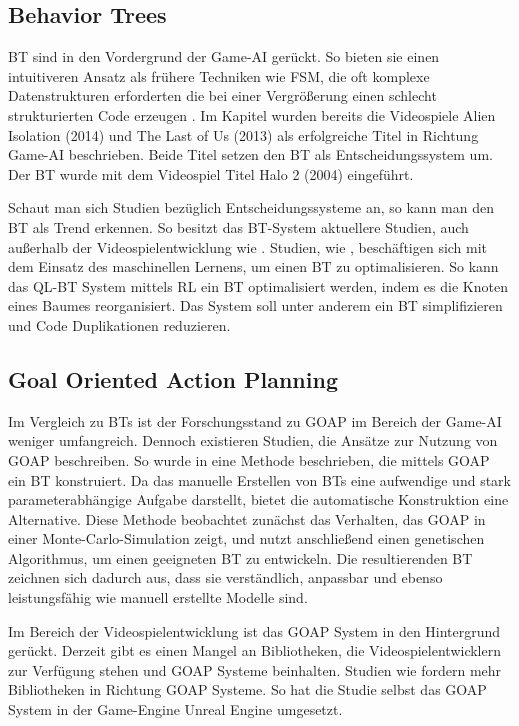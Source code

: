 \subsection{Behavior Trees}
\label{chap:bt sota}

BT sind in den Vordergrund der Game-AI ger\"{u}ckt. So bieten sie einen intuitiveren Ansatz als fr\"{u}here Techniken wie FSM, die oft komplexe Datenstrukturen erforderten die bei einer Vergr\"{o}\ss{}erung einen schlecht strukturierten Code erzeugen \autocite{qlbt}. Im Kapitel wurden bereits die Videospiele Alien Isolation (2014) und The Last of Us (2013) als erfolgreiche Titel in Richtung Game-AI beschrieben. Beide Titel setzen den BT als Entscheidungssystem um. Der BT wurde mit dem Videospiel Titel Halo 2 (2004) eingef\"{u}hrt.

Schaut man sich Studien bez\"{u}glich Entscheidungssysteme an, so kann man den BT als Trend erkennen. So besitzt das BT-System aktuellere Studien, auch au\ss{}erhalb der Videospielentwicklung wie \autocite{btuav, 8963263}. Studien, wie \autocite{rbt, qlbt}, besch\"{a}ftigen sich mit dem Einsatz des maschinellen Lernens, um einen BT zu optimalisieren. So kann das QL-BT System \autocite{qlbt} mittels RL ein BT optimalisiert werden, indem es die Knoten eines Baumes reorganisiert. Das System soll unter anderem ein BT simplifizieren und Code Duplikationen reduzieren.


\subsection{Goal Oriented Action Planning}
\label{chap:goap sota}

Im Vergleich zu BTs ist der Forschungsstand zu GOAP im Bereich der Game-AI weniger umfangreich. Dennoch existieren Studien, die Ans\"{a}tze zur Nutzung von GOAP beschreiben. So wurde in \autocite{Schwab2021} eine Methode beschrieben, die mittels GOAP ein BT konstruiert. Da das manuelle Erstellen von BTs eine aufwendige und stark parameterabh\"{a}ngige Aufgabe darstellt, bietet die automatische Konstruktion eine Alternative. Diese Methode beobachtet zun\"{a}chst das Verhalten, das GOAP in einer Monte-Carlo-Simulation zeigt, und nutzt anschlie\ss{}end einen genetischen Algorithmus, um einen geeigneten BT zu entwickeln. Die resultierenden BT zeichnen sich dadurch aus, dass sie verst\"{a}ndlich, anpassbar und ebenso leistungsf\"{a}hig wie manuell erstellte Modelle sind. \autocite{Schwab2021}

Im Bereich der Videospielentwicklung ist das GOAP System in den Hintergrund ger\"{u}ckt. Derzeit gibt es einen Mangel an Bibliotheken, die Videospielentwicklern zur Verf\"{u}gung stehen und GOAP Systeme beinhalten. Studien wie \autocite{Romero2020DevelopingAA, sielicki2018adaptation} fordern mehr Bibliotheken in Richtung GOAP Systeme. So hat die Studie selbst das GOAP System in der Game-Engine Unreal Engine umgesetzt.



